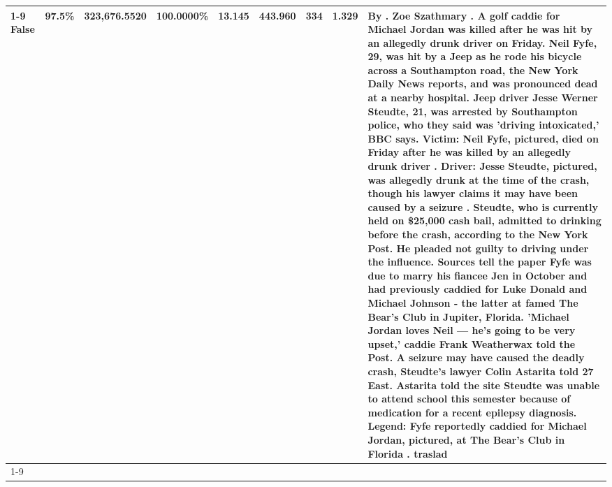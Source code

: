 \begin{table}[H]
\begin{tabular}{lllrlllll}
\cline{1-9}
False & 97.5\% & 323,676.5520 & \bfseries \color{red} 100.0000\% & 13.145 & 443.960 & 334 & 1.329 & By . Zoe Szathmary . A golf caddie for Michael Jordan was killed after he was hit by an allegedly drunk driver on Friday. Neil Fyfe, 29, was hit by a Jeep as he rode his bicycle across a Southampton road, the New York Daily News reports, and was pronounced dead at a nearby hospital. Jeep driver Jesse Werner Steudte, 21, was arrested by Southampton police, who they said was 'driving intoxicated,' BBC says. Victim: Neil Fyfe, pictured, died on Friday after he was killed by an allegedly drunk driver . Driver: Jesse Steudte, pictured, was allegedly drunk at the time of the crash, though his lawyer claims it may have been caused by a seizure . Steudte, who is currently held on \$25,000 cash bail, admitted to drinking before the crash, according to the New York Post. He pleaded not guilty to driving under the influence. Sources tell the paper Fyfe was due to marry his fiancee Jen in October and had previously caddied for Luke Donald and Michael Johnson - the latter at famed The Bear's Club in Jupiter, Florida. 'Michael Jordan loves Neil — he’s going to be very upset,' caddie Frank Weatherwax told the Post. A seizure may have caused the deadly crash, Steudte's lawyer Colin Astarita told 27 East. Astarita told the site Steudte was unable to attend school this semester because of medication for a recent epilepsy diagnosis. Legend: Fyfe reportedly caddied for Michael Jordan, pictured, at The Bear's Club in Florida . traslad \\
\cline{1-9}
\bottomrule
\end{tabular}
\end{table}
